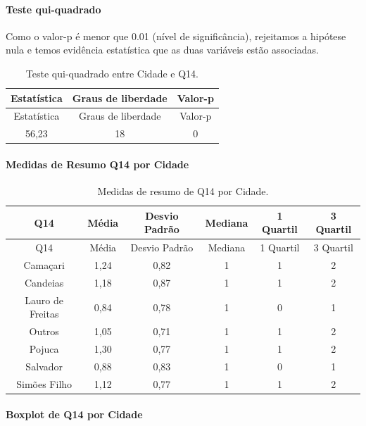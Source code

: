 \documentclass[]{article}
\let\oldparagraph\paragraph
\renewcommand{\paragraph}[1]{\oldparagraph{#1}\mbox{}}
\begin{document}
\hypertarget{teste-qui-quadrado-2}{%
\paragraph{Teste qui-quadrado}\label{teste-qui-quadrado-2}}

Como o valor-p é menor que 0.01 (nível de significância), rejeitamos a hipótese nula e temos evidência estatística que as duas variáveis estão associadas.

\begin{longtable}[]{@{}ccc@{}}
\caption{\label{tab:unnamed-chunk-15}Teste qui-quadrado entre Cidade e Q14.}\tabularnewline
\toprule
Estatística & Graus de liberdade & Valor-p\tabularnewline
\midrule
\endfirsthead
\toprule
Estatística & Graus de liberdade & Valor-p\tabularnewline
\midrule
\endhead
56,23 & 18 & 0\tabularnewline
\bottomrule
\end{longtable}

\cleardoublepage

\hypertarget{medidas-de-resumo-q14-por-cidade}{%
\paragraph{Medidas de Resumo Q14 por Cidade}\label{medidas-de-resumo-q14-por-cidade}}

\begin{longtable}[]{@{}cccccc@{}}
\caption{\label{tab:unnamed-chunk-16}Medidas de resumo de Q14 por Cidade.}\tabularnewline
\toprule
Q14 & Média & Desvio Padrão & Mediana & 1 Quartil & 3 Quartil\tabularnewline
\midrule
\endfirsthead
\toprule
Q14 & Média & Desvio Padrão & Mediana & 1 Quartil & 3 Quartil\tabularnewline
\midrule
\endhead
Camaçari & 1,24 & 0,82 & 1 & 1 & 2\tabularnewline
Candeias & 1,18 & 0,87 & 1 & 1 & 2\tabularnewline
Lauro de Freitas & 0,84 & 0,78 & 1 & 0 & 1\tabularnewline
Outros & 1,05 & 0,71 & 1 & 1 & 2\tabularnewline
Pojuca & 1,30 & 0,77 & 1 & 1 & 2\tabularnewline
Salvador & 0,88 & 0,83 & 1 & 0 & 1\tabularnewline
Simões Filho & 1,12 & 0,77 & 1 & 1 & 2\tabularnewline
\bottomrule
\end{longtable}

\hypertarget{boxplot-de-q14-por-cidade}{%
\paragraph{Boxplot de Q14 por Cidade}\label{boxplot-de-q14-por-cidade}}
\end{document}
